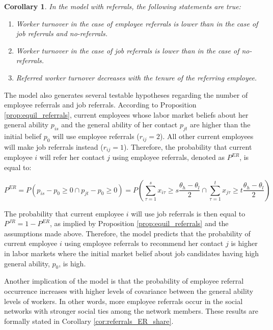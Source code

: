 \documentclass[12pt]{article}
\newtheorem{corollary}[theorem]{Corollary}
\begin{document}
\begin{corollary}\label{cor:referrals_turnover}
In the model with referrals, the following statements are true:
    \begin{enumerate}[label={\roman*})]
        \item Worker turnover in the case of employee referrals is lower than in the case of job referrals and no-referrals.
        \item Worker turnover in the case of job referrals is lower than in the case of no-referrals.
        \item Referred worker turnover decreases with the tenure of the referring employee.
    \end{enumerate}
\end{corollary}

The model also generates several testable hypotheses regarding the number of employee referrals and job referrals. According to Proposition \ref{prop:equil_referrals}, current employees whose labor market beliefs about her general ability $p_{is}$ and the general ability of her contact $p_{jt}$ are higher than the initial belief $p_0$ will use employee referrals ($r_{ij} = 2$). All other current employees will make job referrals instead ($r_{ij}=1$). Therefore, the probability that current employee $i$ will refer her contact $j$ using employee referrals, denoted as $P^{ER}$, is equal to:

\begin{equation}
    P^{ER} = P(p_{is} - p_0 \geq 0 \cap p_{jt} - p_0 \geq 0) = P\left(\sum_{\tau =1}^s x_{i\tau} \geq s\frac{\theta_h - \theta_l}{2} \cap \sum_{\tau =1}^t x_{j\tau} \geq t\frac{\theta_h - \theta_l}{2}\right)
\end{equation}

The probability that current employee $i$ will use job referrals is then equal to $P^{JR} = 1 - P^{ER}$, as implied by Proposition \ref{prop:equil_referrals} and the assumptions made above. Therefore, the model predicts that the probability of current employee $i$ using employee referrals to recommend her contact $j$ is higher in labor markets where the initial market belief about job candidates having high general ability, $p_0$, is high.

Another implication of the model is that the probability of employee referral occurrence increases with higher levels of covariance between the general ability levels of workers. In other words, more employee referrals occur in the social networks with stronger social ties among the network members. These results are formally stated in Corollary \ref{cor:referrals_ER_share}.
\end{document}
